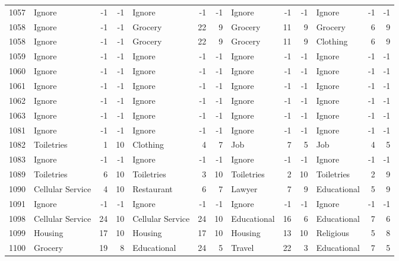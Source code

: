 \begin{figure}[htbp]
\begin{tabular}{rlrrlrrlrrlrr}
    1057  & Ignore & -1    & -1    & Ignore & -1    & -1    & Ignore & -1    & -1    & Ignore & -1    & -1 \\
    1058  & Ignore & -1    & -1    & Grocery & 22    & 9     & Grocery & 11    & 9     & Grocery & 6     & 9 \\
    1058  & Ignore & -1    & -1    & Grocery & 22    & 9     & Grocery & 11    & 9     & Clothing & 6     & 9 \\
    1059  & Ignore & -1    & -1    & Ignore & -1    & -1    & Ignore & -1    & -1    & Ignore & -1    & -1 \\
    1060  & Ignore & -1    & -1    & Ignore & -1    & -1    & Ignore & -1    & -1    & Ignore & -1    & -1 \\
    1061  & Ignore & -1    & -1    & Ignore & -1    & -1    & Ignore & -1    & -1    & Ignore & -1    & -1 \\
    1062  & Ignore & -1    & -1    & Ignore & -1    & -1    & Ignore & -1    & -1    & Ignore & -1    & -1 \\
    1063  & Ignore & -1    & -1    & Ignore & -1    & -1    & Ignore & -1    & -1    & Ignore & -1    & -1 \\
    1081  & Ignore & -1    & -1    & Ignore & -1    & -1    & Ignore & -1    & -1    & Ignore & -1    & -1 \\
    1082  & Toiletries & 1     & 10    & Clothing & 4     & 7     & Job   & 7     & 5     & Job   & 4     & 5 \\
    1083  & Ignore & -1    & -1    & Ignore & -1    & -1    & Ignore & -1    & -1    & Ignore & -1    & -1 \\
    1089  & Toiletries & 6     & 10    & Toiletries & 3     & 10    & Toiletries & 2     & 10    & Toiletries & 2     & 9 \\
    1090  & Cellular Service & 4     & 10    & Restaurant & 6     & 7     & Lawyer & 7     & 9     & Educational & 5     & 9 \\
    1091  & Ignore & -1    & -1    & Ignore & -1    & -1    & Ignore & -1    & -1    & Ignore & -1    & -1 \\
    1098  & Cellular Service & 24    & 10    & Cellular Service & 24    & 10    & Educational & 16    & 6     & Educational & 7     & 6 \\
    1099  & Housing & 17    & 10    & Housing & 17    & 10    & Housing & 13    & 10    & Religious & 5     & 8 \\
    1100  & Grocery & 19    & 8     & Educational & 24    & 5     & Travel & 22    & 3     & Educational & 7     & 5 \\

\end{tabular}
\end{figure}
